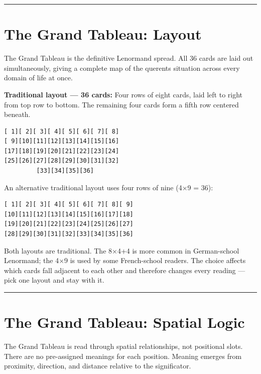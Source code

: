 \begin{center}\rule{0.5\linewidth}{0.5pt}\end{center}

\section{The Grand Tableau: Layout}\label{the-grand-tableau-layout}

The Grand Tableau is the definitive Lenormand spread. All 36 cards are laid out simultaneously, giving a complete map of the querent\textquotesingle s situation across every domain of life at once.

\textbf{Traditional layout --- 36 cards:} Four rows of eight cards, laid left to right from top row to bottom. The remaining four cards form a fifth row centered beneath.

\begin{verbatim}
[ 1][ 2][ 3][ 4][ 5][ 6][ 7][ 8]
[ 9][10][11][12][13][14][15][16]
[17][18][19][20][21][22][23][24]
[25][26][27][28][29][30][31][32]
         [33][34][35][36]
\end{verbatim}

An alternative traditional layout uses four rows of nine (4×9 = 36):

\begin{verbatim}
[ 1][ 2][ 3][ 4][ 5][ 6][ 7][ 8][ 9]
[10][11][12][13][14][15][16][17][18]
[19][20][21][22][23][24][25][26][27]
[28][29][30][31][32][33][34][35][36]
\end{verbatim}

Both layouts are traditional. The 8×4+4 is more common in German-school Lenormand; the 4×9 is used by some French-school readers. The choice affects which cards fall adjacent to each other and therefore changes every reading --- pick one layout and stay with it.

\begin{center}\rule{0.5\linewidth}{0.5pt}\end{center}

\section{The Grand Tableau: Spatial Logic}\label{the-grand-tableau-spatial-logic}

The Grand Tableau is read through spatial relationships, not positional slots. There are no pre-assigned meanings for each position. Meaning emerges from proximity, direction, and distance relative to the significator.

